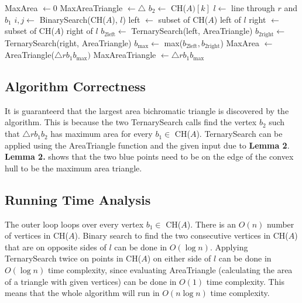 \documentclass{article}
\begin{document}
  \pagebreak

  \begin{algorithmic}
      \State MaxArea $\gets 0$ 
      \State MaxAreaTriangle $\gets \triangle$ 
        \State $b_2 \gets$ CH($A)[k]$ 
        \State $l \gets$ line through $r$ and $b_1$ 
        \State $i, j \gets$ BinarySearch(CH($A$), $l$) 
        \State left $\gets$ subset of CH($A$) left of $l$
        \State right $\gets$ subset of CH($A$) right of $l$
        \State $b_{2\text{left}} \gets$ TernarySearch(left, AreaTriangle) 
        \State $b_{2\text{right}} \gets$ TernarySearch(right, AreaTriangle) 
        \State $b_{\text{max}} \gets$ max($b_{2\text{left}}, b_{2\text{right}}$) 
          \State MaxArea $\gets$ AreaTriangle($\triangle rb_1b_{\text{max}})$ 
          \State MaxAreaTriangle $\gets \triangle rb_1b_{\text{max}}$ 
        \EndIf
      \EndFor
    \EndFunction
  \end{algorithmic}

  \subsection*{Algorithm Correctness}
  It is guaranteerd that the largest area bichromatic triangle is discovered by the algorithm.
  This is because the two TernarySearch calls find the vertex $b_2$ such that $\triangle rb_1b_2$ has maximum area for every $b_1 \in$ CH($A$). 
  TernarySearch can be applied using the AreaTriangle function and the given input due to \textbf{Lemma 2}.
  \textbf{Lemma 2.} shows that the two blue points need to be on the edge of the convex hull to be the maximum area triangle.


    \subsection*{Running Time Analysis}
    The outer loop loops over every vertex $b_1 \in$ CH($A$).
    There is an $O(n)$ number of vertices in CH($A$). 
    Binary search to find the two consecutive vertices in CH($A$) that are on opposite sides of $l$ can be done in $O(\log n)$.
    Applying TernarySearch twice on points in CH($A$) on either side of $l$ can be done in $O(\log n)$ time complexity, since evaluating AreaTriangle (calculating the area of a triangle with given vertices) can be done in  $O(1)$ time complexity.
    This means that the whole algorithm will run in $O(n\log n)$ time complexity.
\end{document}
